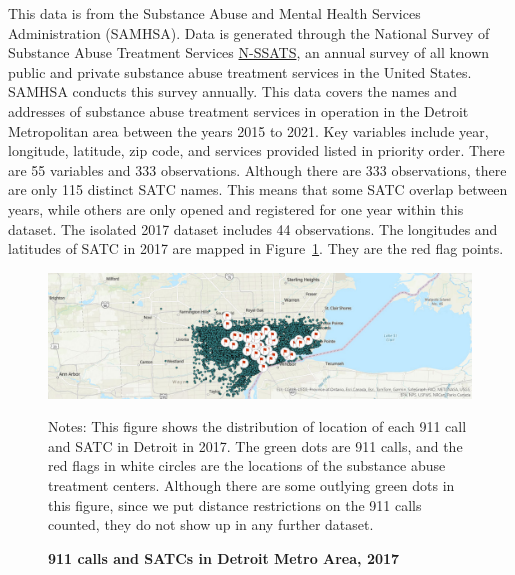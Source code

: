 \documentclass[12pt]{article}
\begin{document}
This data is from the Substance Abuse and Mental Health Services Administration (SAMHSA). Data is generated through the National Survey of Substance Abuse Treatment Services \href{https://www.samhsa.gov/data/data-we-collect/n-ssats-national-survey-substance-abuse-treatment-services}{N-SSATS}, an annual survey of all known public and private substance abuse treatment services in the United States. SAMHSA conducts this survey annually.  This data covers the names and addresses of substance abuse treatment services in operation in the Detroit Metropolitan area between the years 2015 to 2021. Key variables include year, longitude, latitude, zip code, and services provided listed in priority order. There are 55 variables and 333 observations.\footnotemark[2] Although there are 333 observations, there are only 115 distinct SATC names. This means that some SATC overlap between years, while others are only opened and registered for one year within this dataset. The isolated 2017 dataset includes 44 observations. The longitudes and latitudes of SATC in 2017 are mapped in Figure~\ref{fig:Figure2}. They are the red flag points. 

\begin{figure}[h!]
    \centering
\includegraphics[width=0.75\linewidth]{Reproducibility Package/Visual Graphics/ArcGIS_Map.jpg}
    \caption{\textbf{911 calls and SATCs in Detroit Metro Area, 2017}}
    \label{fig:Figure2}
     \centering\small{Notes: This figure shows the distribution of location of each 911 call and SATC in Detroit in 2017. The green dots are 911 calls, and the red flags in white circles are the locations of the substance abuse treatment centers. Although there are some outlying green dots in this figure, since we put distance restrictions on the 911 calls counted, they do not show up in any further dataset.}
    
\end{figure}
\end{document}
